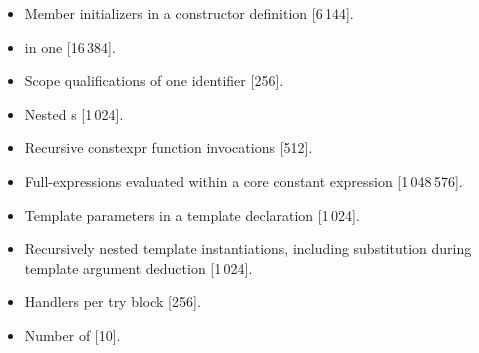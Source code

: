 \begin{itemize}
\item%
Member initializers in a constructor definition [6\,144].
\item%
 in one  [16\,384].
\item%
Scope qualifications of one identifier [256].
\item%
Nested s [1\,024].
\item%
Recursive constexpr function invocations [512].
\item%
Full-expressions evaluated within a core constant expression [1\,048\,576].
\item%
Template parameters in a template declaration [1\,024].
\item%
Recursively nested template instantiations, including substitution
during template argument deduction [1\,024].
\item%
Handlers per try block [256].
\item%
Number of  [10].
\end{itemize}
